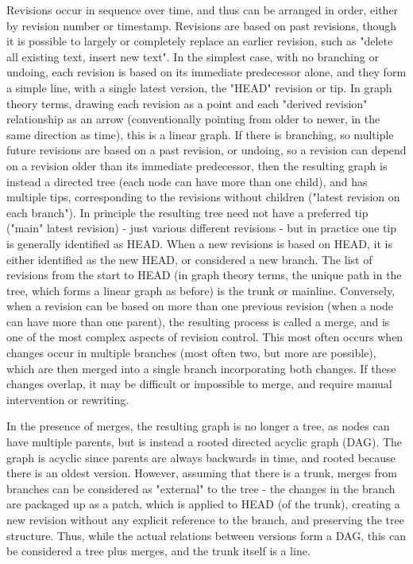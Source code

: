 \documentclass[twoside]{article}
\begin{document}
\begin{multicols}{2}
Revisions occur in sequence over time, and thus can be arranged in order, either by revision number or timestamp. Revisions are based on past revisions, though it is possible to largely or completely replace an earlier revision, such as "delete all existing text, insert new text". In the simplest case, with no branching or undoing, each revision is based on its immediate predecessor alone, and they form a simple line, with a single latest version, the "HEAD" revision or tip. In graph theory terms, drawing each revision as a point and each "derived revision" relationship as an arrow (conventionally pointing from older to newer, in the same direction as time), this is a linear graph. If there is branching, so multiple future revisions are based on a past revision, or undoing, so a revision can depend on a revision older than its immediate predecessor, then the resulting graph is instead a directed tree (each node can have more than one child), and has multiple tips, corresponding to the revisions without children ("latest revision on each branch"). In principle the resulting tree need not have a preferred tip ("main" latest revision) - just various different revisions - but in practice one tip is generally identified as HEAD. When a new revisions is based on HEAD, it is either identified as the new HEAD, or considered a new branch. The list of revisions from the start to HEAD (in graph theory terms, the unique path in the tree, which forms a linear graph as before) is the trunk or mainline. Conversely, when a revision can be based on more than one previous revision (when a node can have more than one parent), the resulting process is called a merge, and is one of the most complex aspects of revision control. This most often occurs when changes occur in multiple branches (most often two, but more are possible), which are then merged into a single branch incorporating both changes. If these changes overlap, it may be difficult or impossible to merge, and require manual intervention or rewriting.

In the presence of merges, the resulting graph is no longer a tree, as nodes can have multiple parents, but is instead a rooted directed acyclic graph (DAG). The graph is acyclic since parents are always backwards in time, and rooted because there is an oldest version. However, assuming that there is a trunk, merges from branches can be considered as "external" to the tree - the changes in the branch are packaged up as a patch, which is applied to HEAD (of the trunk), creating a new revision without any explicit reference to the branch, and preserving the tree structure. Thus, while the actual relations between versions form a DAG, this can be considered a tree plus merges, and the trunk itself is a line.


\end{multicols}
\end{document}
